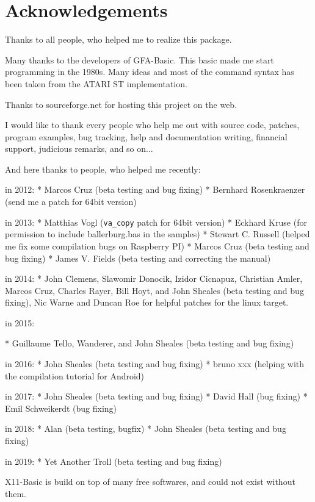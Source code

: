 
\chapter*{Acknowledgements}

Thanks to all people, who helped me to realize this package.

Many  thanks  to  the developers of GFA-Basic. This basic made me
start programming in the 1980s. Many ideas and most of  the  command 
syntax has been taken from the ATARI ST implementation.

Thanks to sourceforge.net for hosting this project on the web.

I would like to thank every people who help me out with source code, 
patches, program examples, bug tracking, help and documentation writing, 
financial support, judicious remarks, and so on...   

And here thanks to people, who helped me recently:

in 2012:
* Marcos Cruz (beta testing and bug fixing)
* Bernhard Rosenkraenzer (send me a patch for 64bit version)

in 2013:
* Matthias Vogl (\verb|va_copy| patch for 64bit version)
* Eckhard Kruse (for permission to include ballerburg.bas in the samples)
* Stewart C. Russell (helped me fix some compilation bugs on Raspberry PI)
* Marcos Cruz (beta testing and bug fixing)
* James V. Fields (beta testing and correcting the manual)

in 2014:
* John Clemens, Slawomir Donocik, Izidor Cicnapuz, Christian Amler,
  Marcos Cruz, Charles Rayer, Bill Hoyt, and John Sheales (beta testing and 
  bug fixing),
  Nic Warne and Duncan Roe for helpful patches for the linux target.

in 2015:

* Guillaume Tello, Wanderer, and John Sheales  (beta testing and bug fixing)

in 2016:
* John Sheales  (beta testing and bug fixing)
* bruno xxx (helping with the compilation tutorial for Android)

in 2017:
* John Sheales  (beta testing and bug fixing)
* David Hall  (bug fixing)
* Emil Schweikerdt  (bug fixing)

in 2018:
* Alan (beta testing, bugfix)
* John Sheales  (beta testing and bug fixing)

in 2019:
* Yet Another Troll  (beta testing and bug fixing)


X11-Basic is build on top of many free softwares, and could not exist without 
them.

